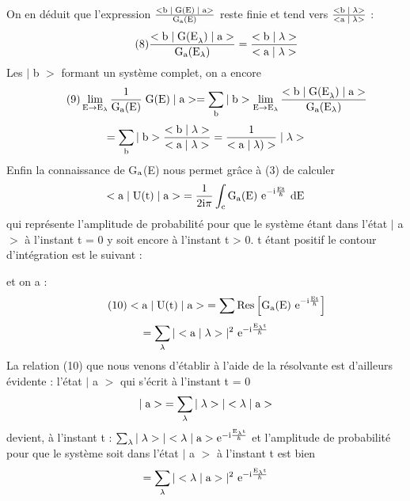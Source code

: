 On en déduit que l'expression $\frac{<\text{b}\;|\;\text{G(E)}\;|\;\text{a}>}{\text{G}_{\text{a}}(\text{E})}$
reste finie et tend vers $\frac{<\text{b}\;|\;\lambda>}{<\text{a}\;|\;\lambda>}$ :
\[
\tag{8}\frac{<\text{b}\;|\;\text{G(E}_\lambda)\;|\;\text{a}>}{\text{G}_{\text{a}}(\text{E}_\lambda)}=
\frac{<\text{b}\;|\;\lambda>}{<\text{a}\;|\;\lambda>}
\]
Les $|$ b $>$ formant un système complet, on a encore
\[
\tag{9}\lim_{\text{E}\to\text{E}_\lambda}\frac{1}{\text{G}_{\text{a}}(\text{E})}\;\text{G(E)}\;|\;\text{a}>=
\sum_{\text{b}}|\;\text{b}>\lim_{\text{E}\to\text{E}_\lambda}
\frac{<\text{b}\;|\;\text{G(E}_\lambda)\;|\;\text{a}>}{\text{G}_{\text{a}}(\text{E}_\lambda)}
\]
\[
=\sum_{\text{b}}|\;\text{b}>\frac{<\text{b}\;|\;\lambda>}{<\text{a}\;|\;\lambda>}=
\frac{1}{<\text{a}\;|\;\lambda)>}\;|\;\lambda>
\]
Enfin la connaissance de G$_{\text{a}}$(E) nous permet grâce à (3) de calculer
\[
<\text{a}\;|\;\text{U(t)}\;|\;\text{a}>\;=\frac{1}{2\text{i}\pi}\int_{\text{c}}\text{G}_{\text{a}}\text{(E) e}^{-\text{i}\frac{\text{Et}}{\hbar}}\text{ dE}
\]
qui représente l'amplitude de probabilité pour que le système étant dans l'état $|$ a $>$
à l'instant t = 0 y soit encore à l'instant t > 0. t étant positif le contour d'intégration est le suivant :
\begin{center}
\end{center}
et on a :
\[
\tag{10}<\text{a}\;|\;\text{U(t)}\;|\;\text{a}>\;=\sum\text{Res}\left[\text{G}_{\text{a}}\text{(E) e}^{-\text{i}\frac{\text{Et}}{\hbar}}\right]
\]
\[
=\sum_\lambda|<\text{a}\;|\;\lambda>|^2\text{ e}^{-\text{i}\frac{\text{E}_\lambda\text{t}}{\hbar}}
\]
La relation (10) que nous venons d'établir à l'aide de la résolvante est d'ailleurs
évidente : l'état $|$ a $>$ qui s'écrit à l'instant t = 0
\[
|\;\text{a}>\;=\sum_\lambda|\;\lambda>|<\lambda\;|\;\text{a}>
\]
devient, à l'instant t : $\sum_\lambda|\;\lambda>|<\lambda\;|\;\text{a}>\text{e}^{-\text{i}\frac{\text{E}_\lambda\text{t}}{\hbar}}$
et l'amplitude de probabilité pour que le système soit dans l'état $|$ a $>$ à l'instant t est bien
\[
=\sum_\lambda|<\lambda\;|\;\text{a}>|^2\text{ e}^{-\text{i}\frac{\text{E}_\lambda\text{t}}{\hbar}}
\]
